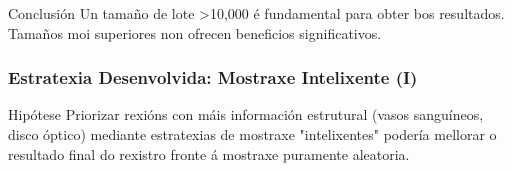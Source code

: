 \documentclass[xcolor=dvipsnames]{beamer}
\begin{document}
\begin{frame}
    \begin{alertblock}{Conclusión}
        Un tamaño de lote >10,000 é fundamental para obter bos resultados. Tamaños moi superiores non ofrecen beneficios significativos.
    \end{alertblock}
    
\end{frame}
\begin{frame}
    \frametitle{Estratexia Desenvolvida: Mostraxe Intelixente (I)}

    \begin{block}{Hipótese}
        Priorizar rexións con máis información estrutural (vasos sanguíneos, disco óptico) mediante estratexias de mostraxe "intelixentes" podería mellorar o resultado final do rexistro fronte á mostraxe puramente aleatoria.
    \end{block}

    \vspace{0cm}


\end{frame}
\end{document}
